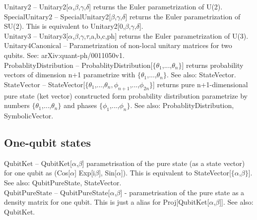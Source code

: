 \noindent\textbf{$ \text{Unitary2} $ }-- Unitary2[$\alpha $,$\beta $,$\gamma $,$\delta $] returns the Euler parametrization of U(2).$  $\\

\noindent\textbf{$ \text{SpecialUnitary2} $ }-- SpecialUnitary2[$\beta $,$\gamma $,$\delta $] returns the Euler parametrization of SU(2). This is equivalent to Unitary2[0,$\beta $,$\gamma $,$\delta $].$  $\\

\noindent\textbf{$ \text{Unitary3} $ }-- Unitary3[$\alpha $,$\beta $,$\gamma $,$\tau $,a,b,c,ph] returns the Euler parametrization of U(3).$  $\\

\noindent\textbf{$ \text{Unitary4Canonical} $ }-- Parametrization of non-local unitary matrices for two qubits. See: arXiv:quant-ph/0011050v1.$  $\\

\noindent\textbf{$ \text{ProbablityDistribution} $ }-- ProbablityDistribution[$\{$$ \theta _1 $,...,$ \theta _n $$\}$] returns probability vectors of dimension n+1 parametrize with $\{$$ \theta _1 $,...,$ \theta _n $$\}$. See also: StateVector.$  $\\

\noindent\textbf{$ \text{StateVector} $ }-- StateVector[$\{$$ \theta _1 $,...,$ \theta _n,\phi _{n+1} $,...,$ \phi _{2 n} $$\}$] returns pure n+1-dimensional pure state (ket vector) constructed form probability distribution parametrize by numbers $\{$$ \theta _1 $,...,$ \theta _n $$\}$ and phases $\{$$ \phi _1 $,...,$ \phi _n $$\}$. See also: ProbablityDistribution, SymbolicVector.$  $\\

\subsection{One-qubit states}

\noindent\textbf{$ \text{QubitKet} $ }-- QubitKet[$\alpha $,$\beta $] parametrisation of the pure state (as a state vector) for one qubit as (Cos[$\alpha $] Exp[i$\beta $], Sin[$\alpha $]). This is equivalent to StateVector[$\{\alpha $,$\beta \}$]. See also: QubitPureState, StateVector.$  $\\

\noindent\textbf{$ \text{QubitPureState} $ }-- QubitPureState[$\alpha $,$\beta $] - parametrisation of the pure state as a density matrix for one qubit. This is just a alias for Proj[QubitKet[$\alpha $,$\beta $]]. See also: QubitKet.$  $\\

